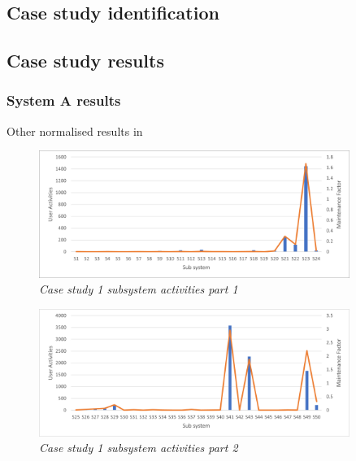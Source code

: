 \subsection{Case study identification}

\subsection{Case study results}

\subsubsection{System A results}
Other normalised results in 

\begin{figure}[!htb]
	\centering %
	\includegraphics[width=0.9\textwidth]{img/ch3/uat/systemA/s1_s24.png}
	\caption[Case study 1 subsystem activities part 1]
	{\textit{Case study 1 subsystem activities part 1}}\label{fig:ch3_saS1S24}
\end{figure} 

\begin{figure}[!htb]
	\centering %
	\includegraphics[width=0.9\textwidth]{img/ch3/uat/systemA/s25_s50.png}
	\caption[Case study 1 subsystem activities part 2]
	{\textit{Case study 1 subsystem activities part 2}}\label{fig:ch3_saS25S50}
\end{figure} 

